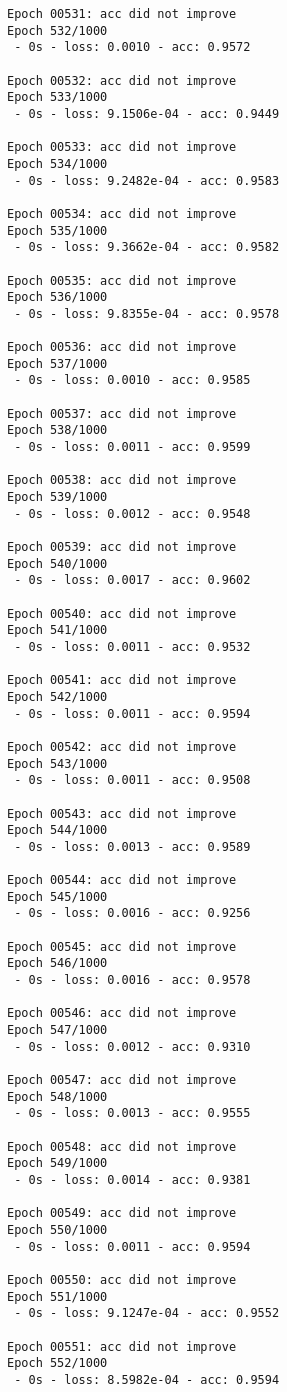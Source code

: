 \documentclass[11pt]{article}
\begin{document}
\begin{Verbatim}[commandchars=\\\{\}]
Epoch 00531: acc did not improve
Epoch 532/1000
 - 0s - loss: 0.0010 - acc: 0.9572

Epoch 00532: acc did not improve
Epoch 533/1000
 - 0s - loss: 9.1506e-04 - acc: 0.9449

Epoch 00533: acc did not improve
Epoch 534/1000
 - 0s - loss: 9.2482e-04 - acc: 0.9583

Epoch 00534: acc did not improve
Epoch 535/1000
 - 0s - loss: 9.3662e-04 - acc: 0.9582

Epoch 00535: acc did not improve
Epoch 536/1000
 - 0s - loss: 9.8355e-04 - acc: 0.9578

Epoch 00536: acc did not improve
Epoch 537/1000
 - 0s - loss: 0.0010 - acc: 0.9585

Epoch 00537: acc did not improve
Epoch 538/1000
 - 0s - loss: 0.0011 - acc: 0.9599

Epoch 00538: acc did not improve
Epoch 539/1000
 - 0s - loss: 0.0012 - acc: 0.9548

Epoch 00539: acc did not improve
Epoch 540/1000
 - 0s - loss: 0.0017 - acc: 0.9602

Epoch 00540: acc did not improve
Epoch 541/1000
 - 0s - loss: 0.0011 - acc: 0.9532

Epoch 00541: acc did not improve
Epoch 542/1000
 - 0s - loss: 0.0011 - acc: 0.9594

Epoch 00542: acc did not improve
Epoch 543/1000
 - 0s - loss: 0.0011 - acc: 0.9508

Epoch 00543: acc did not improve
Epoch 544/1000
 - 0s - loss: 0.0013 - acc: 0.9589

Epoch 00544: acc did not improve
Epoch 545/1000
 - 0s - loss: 0.0016 - acc: 0.9256

Epoch 00545: acc did not improve
Epoch 546/1000
 - 0s - loss: 0.0016 - acc: 0.9578

Epoch 00546: acc did not improve
Epoch 547/1000
 - 0s - loss: 0.0012 - acc: 0.9310

Epoch 00547: acc did not improve
Epoch 548/1000
 - 0s - loss: 0.0013 - acc: 0.9555

Epoch 00548: acc did not improve
Epoch 549/1000
 - 0s - loss: 0.0014 - acc: 0.9381

Epoch 00549: acc did not improve
Epoch 550/1000
 - 0s - loss: 0.0011 - acc: 0.9594

Epoch 00550: acc did not improve
Epoch 551/1000
 - 0s - loss: 9.1247e-04 - acc: 0.9552

Epoch 00551: acc did not improve
Epoch 552/1000
 - 0s - loss: 8.5982e-04 - acc: 0.9594


\end{Verbatim}
\end{document}
